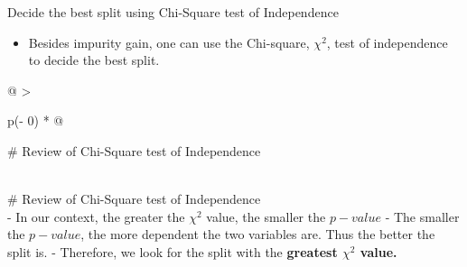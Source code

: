 \documentclass[
  ignorenonframetext,
]{beamer}
\providecommand{\tightlist}{%
  \setlength{\itemsep}{0pt}\setlength{\parskip}{0pt}}
\begin{document}
\begin{frame}{Decide the best split using Chi-Square test of
Independence}
\protect\hypertarget{decide-the-best-split-using-chi-square-test-of-independence}{}
\begin{itemize}
\tightlist
\item
  Besides impurity gain, one can use the Chi-square, \(\chi^2\), test of
  independence to decide the best split.
\end{itemize}

\begin{longtable}[]{@{}
  >{\raggedright\arraybackslash}p{(\columnwidth - 0\tabcolsep) * }@{}}
\toprule
\begin{minipage}[b]{\linewidth}\raggedright
\# Review of Chi-Square test of Independence
\end{minipage} \\
\midrule
\endhead
\# Review of Chi-Square test of Independence \\
- In our context, the greater the \(\chi^2\) value, the smaller the
\(p-value\) - The smaller the \(p-value\), the more dependent the two
variables are. Thus the better the split is. - Therefore, we look for
the split with the \textbf{greatest \(\chi^2\) value.} \\
\bottomrule
\end{longtable}
\end{frame}
\end{document}
